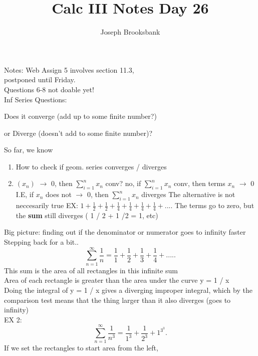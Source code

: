 \documentclass[12pt]{article}
\title{Calc III Notes Day 26}
\author{Joseph Brooksbank}
\begin{document}
\maketitle

Notes: Web Assign 5 involves section 11.3,\\
postponed until Friday. 
\\
Questions 6-8 not doable yet!
\\
Inf Series
Questions:
\begin{list}{}
\item Does it converge (add up to some finite number?) 
\item or Diverge (doesn't add to some finite number)?  
\end{list}
So far, we know 
\begin{enumerate}
\item How to check if geom. series converges / diverges 
\item  $(x_n)$ $\to$ 0, then $ \sum^{n}_{i=1} x_n$ conv?
        \subitem no, if $\sum^{n}_{i=1} x_n$ conv, then terms $x_n$ $\to$ 0 
        \subsubitem I.E, if $x_n$ does not $\to$ 0, then $ \sum^{n}_{i=1} x_n$ diverges
        \subsubitem The alternative is not neccesarily true
        \subsubitem EX: $1 + \frac{1}{2} + \frac{1}{2} + \frac{1}{4} + \frac{1}{4} + \frac{1}{4} + \frac{1}{4} +....$ 
        \subsubitem The terms go to zero, but the \textbf{sum} still diverges ( 1 / 2 + 1 /2 = 1, etc) 
\end{enumerate}
\noindent{}
Big picture: finding out if the denominator or numerator goes to infinity faster 
\\
Stepping back for a bit..
\\
\[
        \sum^{\infty}_{n=1} \frac{1}{n} = \frac{1}{1} + \frac{1}{2} + \frac{1}{3} + \frac{1}{4} +....
.\] 
This sum is the area of all rectangles in this infinite sum 
\\
Area of each rectangle is greater than the area under the curve y = 1 / x 
\\
Doing the integral of y = 1 / x gives a diverging improper integral, which by the comparison test means that the thing larger than it also diverges (goes to infinity) 
\\
EX 2:
\[
\sum_{n=1}^{\infty} \frac{1}{n^{3}} = \frac{1}{1^{3}} + \frac{1}{2^{3}} + 1^{3^{3}} 
.\] 
If we set the rectangles to start area from the left, \\
\end{document}
